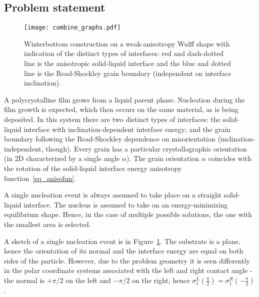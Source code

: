 \subsection{Problem statement}
\begin{figure}
	\centering
	\texttt{[image: combine\_graphs.pdf]}
	\caption{Winterbottom construction on a weak-anisotropy Wulff shape with indication of the distinct types of interfaces: red and dash-dotted line is the anisotropic solid-liquid interface and the blue and dotted line is the Read-Shockley grain boundary (independent on interface inclination). }
	\label{fig_NPA_sketch_of_problem}
\end{figure}
A polycrystalline film grows from a liquid parent phase. Nucleation during the film growth is expected, which then occurs on the same material, as is being deposited. In this system there are two distinct types of interfaces: the solid-liquid interface with inclination-dependent interface energy; and the grain boundary following the Read-Shockley dependence on misorientation (inclination-independent, though). Every grain has a particular crystallographic orientation (in 2D characterized by a single angle $\alpha$). The grain orientation $\alpha$ coincides with the rotation of the solid-liquid interface energy anisotropy function~\eqref{eq_anisofun}.

A single nucleation event is always assumed to take place on a straight solid-liquid interface. The nucleus is assumed to take on an energy-minimizing equilibrium shape. Hence, in the case of multiple possible solutions, the one with the smallest area is selected. 

A sketch of a single nucleation event is in Figure~\ref{fig_NPA_sketch_of_problem}. The substrate is a plane, hence the orientation of its normal and the interface energy are equal on both sides of the particle. However, due to the problem geometry it is seen differently in the polar coordinate systems associated with the left and right contact angle - the normal is $+\pi/2$ on the left and $-\pi/2$ on the right, hence $\sigma_{1}^L\left(\frac{\pi}{2}\right)=\sigma_{1}^R\left(-\frac{\pi}{2}\right)$. 

